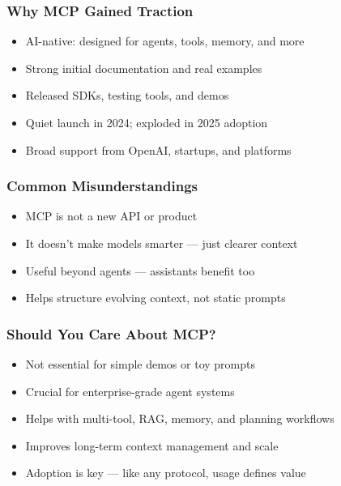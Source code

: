 \begin{frame}[fragile]\frametitle{Why MCP Gained Traction}
      \begin{itemize}
        \item AI-native: designed for agents, tools, memory, and more
        \item Strong initial documentation and real examples
        \item Released SDKs, testing tools, and demos
        \item Quiet launch in 2024; exploded in 2025 adoption
        \item Broad support from OpenAI, startups, and platforms
      \end{itemize}
\end{frame}

\begin{frame}[fragile]\frametitle{Common Misunderstandings}
      \begin{itemize}
        \item MCP is not a new API or product
        \item It doesn’t make models smarter — just clearer context
        \item Useful beyond agents — assistants benefit too
        \item Helps structure evolving context, not static prompts
      \end{itemize}
\end{frame}

\begin{frame}[fragile]\frametitle{Should You Care About MCP?}
      \begin{itemize}
        \item Not essential for simple demos or toy prompts
        \item Crucial for enterprise-grade agent systems
        \item Helps with multi-tool, RAG, memory, and planning workflows
        \item Improves long-term context management and scale
        \item Adoption is key — like any protocol, usage defines value
      \end{itemize}
\end{frame}




